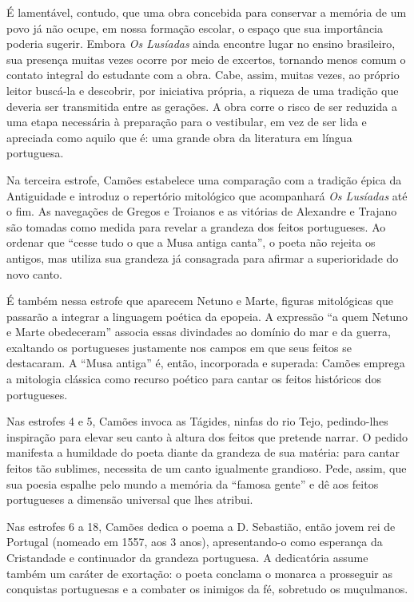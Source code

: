 É lamentável, contudo, que uma obra concebida para conservar a memória de um
povo já não ocupe, em nossa formação escolar, o espaço que sua importância
poderia sugerir. Embora \textit{Os Lusíadas} ainda encontre lugar no ensino
brasileiro, sua presença muitas vezes ocorre por meio de excertos, tornando
menos comum o contato integral do estudante com a obra. Cabe, assim, muitas
vezes, ao próprio leitor buscá-la e descobrir, por iniciativa própria, a
riqueza de uma tradição que deveria ser transmitida entre as gerações. A obra
corre o risco de ser reduzida a uma etapa necessária à preparação para o
vestibular, em vez de ser lida e apreciada como aquilo que é: uma grande obra
da literatura em língua portuguesa.

\ornamentalbreak

Na terceira estrofe, Camões estabelece uma comparação com a tradição épica da
Antiguidade e introduz o repertório mitológico que acompanhará \textit{Os
Lusíadas} até o fim. As navegações de Gregos e Troianos e as vitórias de
Alexandre e Trajano são tomadas como medida para revelar a grandeza dos feitos
portugueses. Ao ordenar que ``cesse tudo o que a Musa antiga canta'', o poeta
não rejeita os antigos, mas utiliza sua grandeza já consagrada para afirmar a
superioridade do novo canto.

É também nessa estrofe que aparecem Netuno e Marte, figuras mitológicas que
passarão a integrar a linguagem poética da epopeia. A expressão ``a quem Netuno
e Marte obedeceram'' associa essas divindades ao domínio do mar e da guerra,
exaltando os portugueses justamente nos campos em que seus feitos se
destacaram. A ``Musa antiga'' é, então, incorporada e superada: Camões emprega
a mitologia clássica como recurso poético para cantar os feitos históricos dos
portugueses.

\ornamentalbreak

Nas estrofes 4 e 5, Camões invoca as Tágides, ninfas do rio Tejo, pedindo-lhes
inspiração para elevar seu canto à altura dos feitos que pretende narrar. O
pedido manifesta a humildade do poeta diante da grandeza de sua matéria: para
cantar feitos tão sublimes, necessita de um canto igualmente grandioso. Pede,
assim, que sua poesia espalhe pelo mundo a memória da ``famosa gente'' e dê aos
feitos portugueses a dimensão universal que lhes atribui.

\ornamentalbreak

Nas estrofes 6 a 18, Camões dedica o poema a D. Sebastião, então jovem rei de
Portugal (nomeado em 1557, aos 3 anos), apresentando-o como esperança da
Cristandade e continuador da grandeza portuguesa. A dedicatória assume também
um caráter de exortação: o poeta conclama o monarca a prosseguir as conquistas
portuguesas e a combater os inimigos da fé, sobretudo os muçulmanos.


